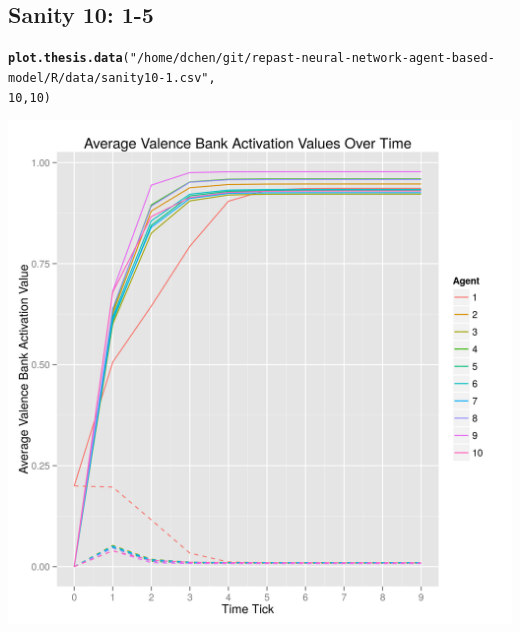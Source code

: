\documentclass{article}\usepackage[]{graphicx}\usepackage[]{color}
\makeatletter
\def\maxwidth{ %
  \ifdim\Gin@nat@width>\linewidth
    \linewidth
  \else
    \Gin@nat@width
  \fi
}
\newcommand{\hlnum}[1]{\textcolor[rgb]{0.686,0.059,0.569}{#1}}%
\newcommand{\hlstr}[1]{\textcolor[rgb]{0.192,0.494,0.8}{#1}}%
\newcommand{\hlstd}[1]{\textcolor[rgb]{0.345,0.345,0.345}{#1}}%
\newcommand{\hlkwd}[1]{\textcolor[rgb]{0.737,0.353,0.396}{\textbf{#1}}}%
\newenvironment{kframe}{%
 \def\at@end@of@kframe{}%
 \ifinner\ifhmode%
  \def\at@end@of@kframe{\end{minipage}}%
  \begin{minipage}{\columnwidth}%
 \fi\fi%
 \def\FrameCommand##1{\hskip\@totalleftmargin \hskip-\fboxsep
 \colorbox{shadecolor}{##1}\hskip-\fboxsep
     \hskip-\linewidth \hskip-\@totalleftmargin \hskip\columnwidth}%
 \MakeFramed {\advance\hsize-\width
   \@totalleftmargin\z@ \linewidth\hsize
   \@setminipage}}%
 {\par\unskip\endMakeFramed%
 \at@end@of@kframe}
\newenvironment{knitrout}{}{} %
\makeatother
\begin{document}
\subsection{Sanity 10: 1-5}
\begin{knitrout}
\color{fgcolor}\begin{kframe}
\begin{alltt}
\hlkwd{plot.thesis.data}\hlstd{(}\hlstr{"/home/dchen/git/repast-neural-network-agent-based-model/R/data/sanity10-1.csv"}\hlstd{,}
    \hlnum{10}\hlstd{,} \hlnum{10}\hlstd{)}
\end{alltt}
\end{kframe}
\includegraphics[width=\maxwidth]{figure/unnamed-chunk-1} 

\end{knitrout}
\end{document}
